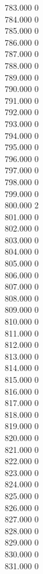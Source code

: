 { 783.000	0 \\
 784.000	0 \\
 785.000	0 \\
 786.000	0 \\
 787.000	0 \\
 788.000	0 \\
 789.000	0 \\
 790.000	0 \\
 791.000	0 \\
 792.000	0 \\
 793.000	0 \\
 794.000	0 \\
 795.000	0 \\
 796.000	0 \\
 797.000	0 \\
 798.000	0 \\
 799.000	0 \\
 800.000	2 \\
 801.000	0 \\
 802.000	0 \\
 803.000	0 \\
 804.000	0 \\
 805.000	0 \\
 806.000	0 \\
 807.000	0 \\
 808.000	0 \\
 809.000	0 \\
 810.000	0 \\
 811.000	0 \\
 812.000	0 \\
 813.000	0 \\
 814.000	0 \\
 815.000	0 \\
 816.000	0 \\
 817.000	0 \\
 818.000	0 \\
 819.000	0 \\
 820.000	0 \\
 821.000	0 \\
 822.000	0 \\
 823.000	0 \\
 824.000	0 \\
 825.000	0 \\
 826.000	0 \\
 827.000	0 \\
 828.000	0 \\
 829.000	0 \\
 830.000	0 \\
 831.000	0 \\
}
